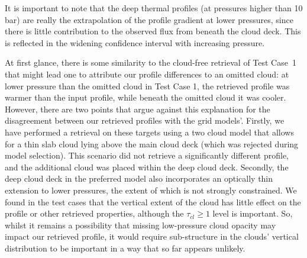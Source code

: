 \documentclass[useAMS,usenatbib]{mn2e}
\begin{document}
It is important to note that the deep thermal profiles (at pressures higher than 10 bar) are really the extrapolation of the profile gradient at lower pressures, since there is little contribution to the observed flux from beneath the cloud deck. This is reflected in the widening confidence interval with increasing pressure.

 
 
At first glance, there is some similarity to the cloud-free retrieval of Test Case~1 that might lead one to attribute our profile differences to an omitted cloud: at lower pressure than the omitted cloud in Test Case 1, the retrieved profile was warmer than the input profile, while beneath the omitted cloud it was cooler.  However, there are two points that argue against this explanation for the disagreement between our retrieved profiles with the grid models'. Firstly, we have performed a retrieval on these targets using a two cloud model that allows for a thin slab cloud lying above the main cloud deck (which was rejected during model selection). This scenario did not retrieve a significantly different profile, and the additional cloud was placed within the deep cloud deck. Secondly, the deep cloud deck in the preferred model also incorporates an optically thin extension to lower pressures, the extent of which is not strongly constrained. We found in the test cases that the vertical extent of the cloud has little effect on the profile or other retrieved properties, although the $\tau_{cl} \geq 1$ level is important. So, whilst it remains a possibility that missing low-pressure cloud opacity may impact our retrieved profile, it would require sub-structure in the clouds' vertical distribution to be important in a way that so far appears unlikely. 
\end{document}

